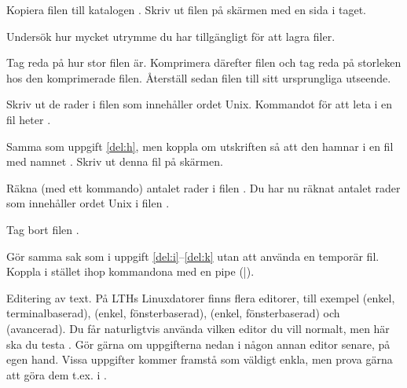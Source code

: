\begin{Datorarbete}
\begin{Deluppgifter}
		\item Kopiera filen  till katalogen . Skriv ut filen på skärmen med en sida i taget.
		\item Undersök hur mycket utrymme du har tillgängligt för att lagra filer.
		\item Tag reda på hur stor filen  är. Komprimera därefter filen och tag reda på storleken hos den komprimerade filen. Återställ sedan filen till sitt ursprungliga utseende.
		\item \label{del:h} Skriv ut de rader i filen  som innehåller ordet Unix. Kommandot för att leta i en fil heter .
		\item \label{del:i} Samma som uppgift \ref{del:h}, men koppla om utskriften så att den hamnar i en fil med namnet . Skriv ut denna fil på skärmen.
		\item Räkna (med ett kommando) antalet rader i filen . Du har nu räknat antalet rader som innehåller ordet Unix i filen .
		\item \label{del:k} Tag bort filen .
		\item Gör samma sak som i uppgift \ref{del:i}--\ref{del:k} utan att använda en temporär fil. Koppla i stället ihop kommandona med en pipe (|).
	\end{Deluppgifter}
	\item Editering av text. På LTHs Linuxdatorer finns flera editorer, till exempel  (enkel, terminalbaserad),  (enkel, fönsterbaserad),  (enkel, fönsterbaserad) och  (avancerad). Du får naturligtvis använda vilken editor du vill normalt, men här ska du testa . Gör gärna om uppgifterna nedan i någon annan editor senare, på egen hand. Vissa uppgifter kommer framstå som väldigt enkla, men prova gärna att göra dem t.ex. i .


\end{Datorarbete}
